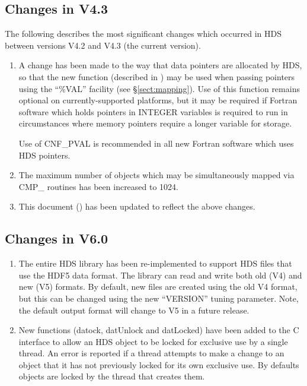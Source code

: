 \documentclass[twoside,11pt]{starlink}
\providecommand{\qt}[1]{``#1''}
\begin{document}
\newpage
\subsection{Changes in V4.3}

The following describes the most significant changes which occurred in HDS
between versions V4.2 and V4.3 (the current version).

\begin{enumerate}
\item A change has been made to the way that data pointers are
allocated by HDS, so that the new 
function (described in ) may be used when
passing pointers using the \qt{\%VAL} facility (see
\S\ref{sect:mapping}). Use of this function remains optional on
currently-supported platforms, but it may be required if Fortran
software which holds pointers in INTEGER variables is required to run
in circumstances where memory pointers require a longer variable for
storage.

Use of CNF\_PVAL is recommended in all new Fortran software which uses
HDS pointers.

\item The maximum number of objects which may be simultaneously mapped
via CMP\_ routines has been increased to 1024.

\item This document () has been updated to
reflect the above changes.
\end{enumerate}

\newpage
\subsection{Changes in V6.0}

\begin{enumerate}
\item The entire HDS library has been re-implemented to support HDS files that
use the HDF5 data format. The library can read and write both old (V4) and new
(V5) formats. By default, new files are created using the old V4 format,
but this can be changed using the new ``VERSION'' tuning parameter. Note,
the default output format will change to V5 in a future release.

\item New functions (datock, datUnlock and datLocked) have been added to the
C interface to allow an HDS object to be locked for exclusive use by a single
thread. An error is reported if a thread attempts to make a change to an
object that it has not previously locked for its own exclusive use. By
defaults objects are locked by the thread that creates them.
\end{enumerate}
\end{document}
